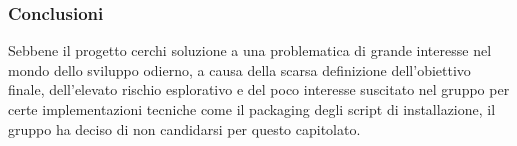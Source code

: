 \subsubsection{Conclusioni}
Sebbene il progetto cerchi soluzione a una problematica di grande interesse nel mondo dello sviluppo odierno, a causa della scarsa definizione dell'obiettivo finale, dell'elevato rischio esplorativo e del poco interesse suscitato nel gruppo per certe implementazioni tecniche come il packaging degli script di installazione, il gruppo ha deciso di non candidarsi per questo capitolato.